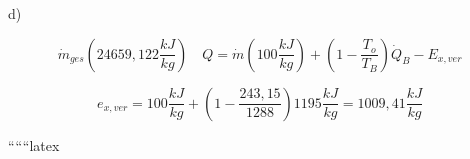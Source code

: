 d)

\[
\dot{m}_{ges} \left( 24659,122 \frac{kJ}{kg} \right) \quad Q = \dot{m} \left( 100 \frac{kJ}{kg} \right) + \left( 1 - \frac{T_o}{T_B} \right) \dot{Q}_B - E_{x,ver}
\]

\[
e_{x,ver} = 100 \frac{kJ}{kg} + \left( 1 - \frac{243,15}{1288} \right) 1195 \frac{kJ}{kg} = 1009,41 \frac{kJ}{kg}
\]

``````latex